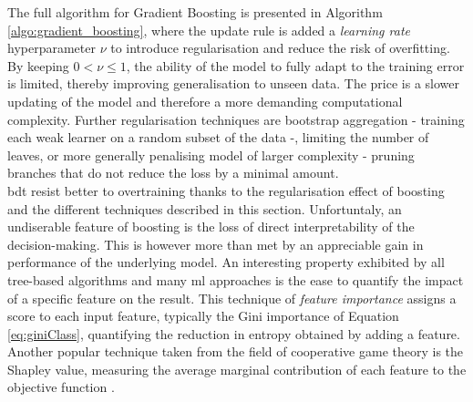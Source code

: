 The full algorithm for Gradient Boosting is presented in Algorithm \ref{algo:gradient_boosting}, where the update rule is added a \textit{learning rate} hyperparameter $\nu$ to introduce regularisation and reduce the risk of overfitting. By keeping $0 < \nu \leq 1$, the ability of the model to fully adapt to the training error is limited, thereby improving generalisation to unseen data. The price is a slower updating of the model and therefore a more demanding computational complexity. Further regularisation techniques are bootstrap aggregation - training each weak learner on a random subset of the data -, limiting the number of leaves, or more generally penalising model of larger complexity - pruning branches that do not reduce the loss by a minimal amount. \\

\gls{bdt} resist better to overtraining thanks to the regularisation effect of boosting and the different techniques described in this section. Unfortuntaly, an undiserable feature of boosting is the loss of direct interpretability of the decision-making. This is however more than met by an appreciable gain in performance of the underlying model. An interesting property exhibited by all tree-based algorithms and many \gls{ml} approaches is the ease to quantify the impact of a specific feature on the result. This technique of \textit{feature importance} assigns a score to each input feature, typically the Gini importance of Equation \ref{eq:giniClass}, quantifying the reduction in entropy obtained by adding a feature. Another popular technique taken from the field of cooperative game theory is the Shapley value, measuring the average marginal contribution of each feature to the objective function \cite{shapley:book1952, Rozemberczki2022TheSV}.

